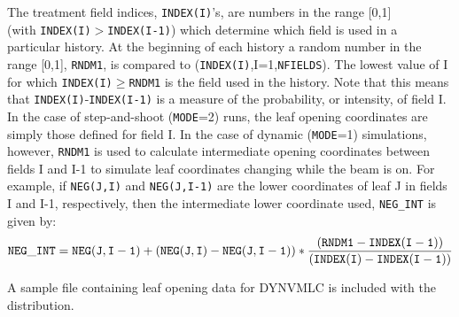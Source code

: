 \documentclass[12pt,twoside]{article}
\begin{document}
The treatment field indices, {\tt INDEX(I)}'s, are numbers in
the range [0,1]\\
 (with {\tt INDEX(I)}$>${\tt INDEX(I-1)}) which determine
which field is used in a particular history.  At the beginning of each
history a random number in the range [0,1], {\tt RNDM1}, is compared to
({\tt INDEX(I)},I=1,{\tt NFIELDS}).  The lowest value of I
for which {\tt INDEX(I)}$\geq${\tt RNDM1} is the field used in the
history. Note that this means that {\tt INDEX(I)}-{\tt INDEX(I-1)} is
a measure of the probability, or intensity, of field I.  In the case of step-and-shoot ({\tt MODE}=2) runs, the leaf
opening coordinates are simply those defined for field I.  In
the case of dynamic ({\tt MODE}=1) simulations, however, {\tt RNDM1} is
used to calculate intermediate opening coordinates between fields
I and I-1 to simulate leaf coordinates changing while the beam is on.
For example, if {\tt NEG(J,I)} and {\tt NEG(J,I-1)} are the lower
coordinates of leaf J in fields I and I-1, respectively, then the intermediate
lower coordinate used, {\tt NEG\_INT} is given by:
\begin{equation}
{\tt NEG\_INT}={\tt NEG(J,I-1)}+\left({\tt NEG(J,I)}-{\tt NEG(J,I-1)}\right)*
\frac{\left({\tt RNDM1}-{\tt INDEX(I-1)}\right)}
{\left({\tt INDEX(I)}-{\tt INDEX(I-1)}\right)}
\end{equation}

A sample file containing leaf opening data for DYNVMLC is included with
the distribution.
\end{document}
